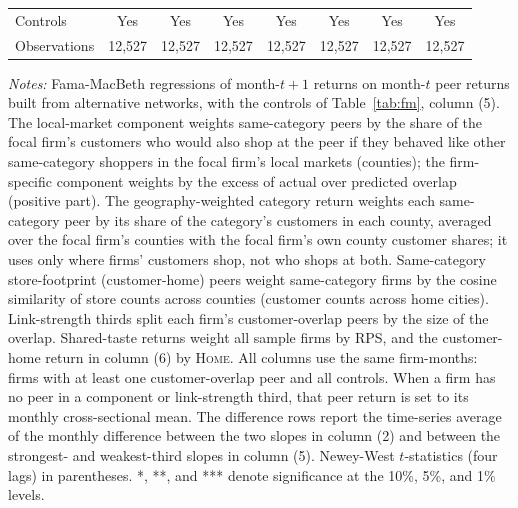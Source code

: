 \begin{table}[!htbp]
\begin{tabular*}{\linewidth}{@{\extracolsep{\fill}}lccccccc}
\addlinespace
Controls & Yes & Yes & Yes & Yes & Yes & Yes & Yes \\
Observations & 12,527 & 12,527 & 12,527 & 12,527 & 12,527 & 12,527 & 12,527 \\
\bottomrule
\end{tabular*}
\par\vspace{4pt}\begin{minipage}{\linewidth}\scriptsize \emph{Notes:} Fama-MacBeth regressions of month-$t+1$ returns on month-$t$ peer returns built from alternative networks, with the controls of Table~\ref{tab:fm}, column (5). The local-market component weights same-category peers by the share of the focal firm's customers who would also shop at the peer if they behaved like other same-category shoppers in the focal firm's local markets (counties); the firm-specific component weights by the excess of actual over predicted overlap (positive part). The geography-weighted category return weights each same-category peer by its share of the category's customers in each county, averaged over the focal firm's counties with the focal firm's own county customer shares; it uses only where firms' customers shop, not who shops at both. Same-category store-footprint (customer-home) peers weight same-category firms by the cosine similarity of store counts across counties (customer counts across home cities). Link-strength thirds split each firm's customer-overlap peers by the size of the overlap. Shared-taste returns weight all sample firms by RPS, and the customer-home return in column (6) by \textsc{Home}. All columns use the same firm-months: firms with at least one customer-overlap peer and all controls. When a firm has no peer in a component or link-strength third, that peer return is set to its monthly cross-sectional mean. The difference rows report the time-series average of the monthly difference between the two slopes in column (2) and between the strongest- and weakest-third slopes in column (5). Newey-West $t$-statistics (four lags) in parentheses. *, **, and *** denote significance at the 10\%, 5\%, and 1\% levels.\end{minipage}
\end{table}